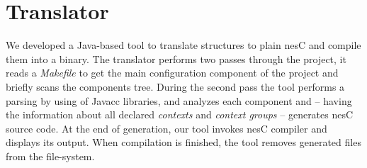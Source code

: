 \section{Translator}\label{sec:translator}

We developed a Java-based tool to translate \conesc structures to plain nesC and
compile them into a binary. The translator performs two passes through the
project, it reads a \emph{Makefile} to get the main configuration component of
the project and briefly scans the components tree. During the second pass the
tool performs a parsing by using of Javacc libraries, and analyzes each
component and -- having the information about all declared \emph{contexts} and
\emph{context groups} -- generates nesC source code. At the end of generation,
our tool invokes nesC compiler and displays its output. When compilation is
finished, the tool removes generated files from the file-system.



